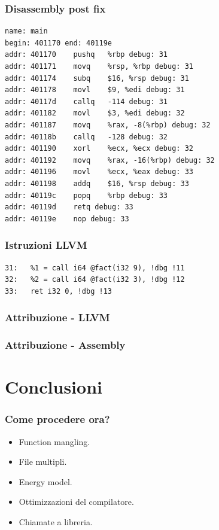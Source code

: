 \documentclass{beamer}
\begin{document}
\begin{frame}[fragile]
\frametitle{Disassembly post fix}
\begin{verbatim}
name: main
begin: 401170 end: 40119e
addr: 401170 	pushq	%rbp debug: 31 
addr: 401171 	movq	%rsp, %rbp debug: 31 
addr: 401174 	subq	$16, %rsp debug: 31 
addr: 401178 	movl	$9, %edi debug: 31 
addr: 40117d 	callq	-114 debug: 31 
addr: 401182 	movl	$3, %edi debug: 32 
addr: 401187 	movq	%rax, -8(%rbp) debug: 32 
addr: 40118b 	callq	-128 debug: 32 
addr: 401190 	xorl	%ecx, %ecx debug: 32 
addr: 401192 	movq	%rax, -16(%rbp) debug: 32 
addr: 401196 	movl	%ecx, %eax debug: 33 
addr: 401198 	addq	$16, %rsp debug: 33 
addr: 40119c 	popq	%rbp debug: 33 
addr: 40119d 	retq debug: 33 
addr: 40119e 	nop debug: 33 
\end{verbatim}
\end{frame}

\begin{frame}[fragile]
\frametitle{Istruzioni LLVM}
\begin{verbatim}
31:   %1 = call i64 @fact(i32 9), !dbg !11
32:   %2 = call i64 @fact(i32 3), !dbg !12
33:   ret i32 0, !dbg !13
\end{verbatim}
\end{frame}

\begin{frame}
\frametitle{Attribuzione - LLVM}

\end{frame}

\begin{frame}
\frametitle{Attribuzione - Assembly}

\end{frame}

\section{Conclusioni}
\begin{frame}
\frametitle{Come procedere ora?}
\begin{itemize}
\item Function mangling.
\item File multipli.
\item Energy model.
\item Ottimizzazioni del compilatore.
\item Chiamate a libreria.
\end{itemize}
\end{frame}
\end{document}
